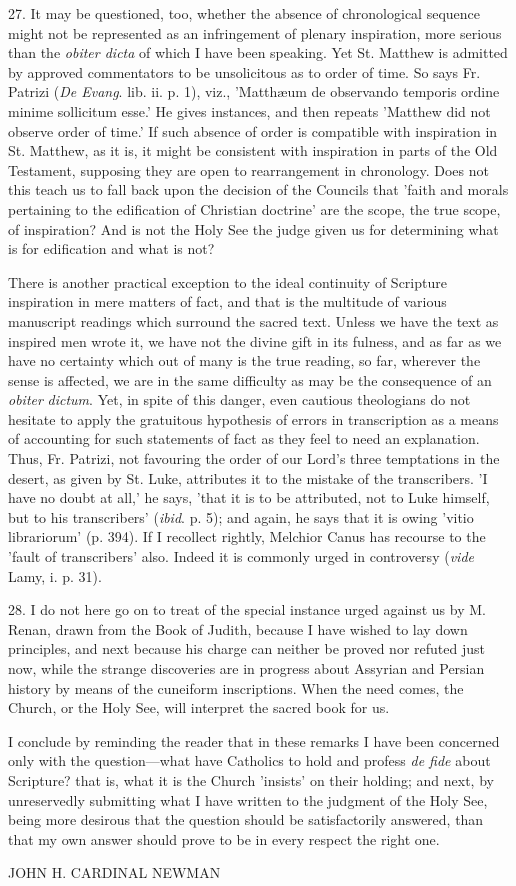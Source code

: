 27. It may be questioned, too, whether the
absence of chronological sequence might not be represented as an
infringement of plenary inspiration, more serious than the \emph{obiter
dicta} of which I have been speaking. Yet St. Matthew is admitted
by approved commentators to be unsolicitous as to order of time. So
says Fr. Patrizi (\emph{De Evang}. lib. ii. p. 1), viz., 'Matthæum de
observando temporis ordine minime sollicitum esse.' He gives
instances, and then repeats 'Matthew did not observe order of time.'
If such absence of order is compatible with inspiration in St.
Matthew, as it is, it might be consistent with inspiration in parts of
the Old Testament, supposing they are open to rearrangement in
chronology. Does not this teach us to fall back upon the decision of
the Councils that 'faith and morals pertaining to the edification of
Christian doctrine' are the scope, the true scope, of inspiration? And
is not the Holy See the judge given us for determining what is for
edification and what is not?

There is another practical exception to the ideal
continuity of Scripture inspiration in mere matters of fact, and that
is the multitude of various manuscript readings which surround the
sacred text. Unless we have the text as inspired men wrote it, we have
not the divine gift in its fulness, and as far as we have no certainty
which out of many is the true reading, so far, wherever the sense is
affected, we are in the same difficulty as may be the consequence of
an \emph{obiter} \emph{dictum}. Yet, in spite of this danger,
even cautious theologians do not hesitate to apply the gratuitous
hypothesis of errors in transcription as a means of accounting for
such statements of fact as they feel to need an explanation. Thus, Fr.
Patrizi, not favouring the order of our Lord's three temptations in
the desert, as given by St. Luke, attributes it to the mistake of the
transcribers. 'I have no doubt at all,' he says, 'that it is to be
attributed, not to Luke himself, but to his transcribers' (\emph{ibid}.
p. 5); and again, he says that it is owing 'vitio librariorum' (p.
394). If I recollect rightly, Melchior Canus has recourse to the
'fault of transcribers' also. Indeed it is commonly urged in
controversy (\emph{vide} Lamy, i. p. 31).

28. I do not here go on to treat of the special
instance urged against us by M. Renan, drawn from the Book of Judith,
because I have wished to lay down principles, and next because his
charge can neither be proved nor refuted just now, while the strange
discoveries are in progress about Assyrian and Persian history by
means of the cuneiform inscriptions. When the need comes, the Church,
or the Holy See, will interpret the sacred book for us.

I conclude by reminding the reader that in these
remarks I have been concerned only with the question—what have
Catholics to hold and profess \emph{de fide} about Scripture? that is,
what it is the Church 'insists' on their holding; and next, by
unreservedly submitting what I have written to the judgment of the
Holy See, being more desirous that the question should be
satisfactorily answered, than that my own answer should prove to be in
every respect the right one.

JOHN H. CARDINAL
NEWMAN
